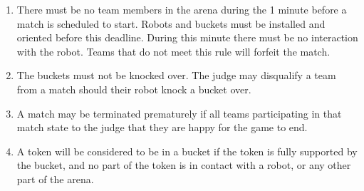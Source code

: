 \begin{enumerate}
\item There must be no team members in the arena during the 1 minute before a match is scheduled to start.
      Robots and buckets must be installed and oriented before this deadline.
      During this minute there must be no interaction with the robot.
      Teams that do not meet this rule will forfeit the match.

\item The buckets must not be knocked over.
      The judge may disqualify a team from a match should their robot knock a bucket over.

\item A match may be terminated prematurely if all teams participating in that match state to the judge that they are happy for the game to end.

\item A token will be considered to be in a bucket if the token is fully supported by the bucket, and no part of the token is in contact with a robot, or any other part of the arena.

\end{enumerate}

